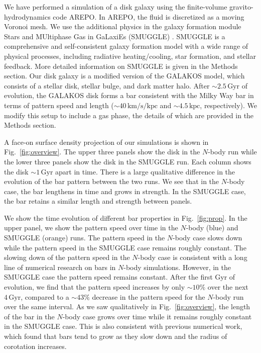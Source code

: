 \documentclass[twoside]{natureprintstyle}
\newcommand{\Nbody}{$N$-body}
\newcommand{\AREPO}{\textsc{AREPO}}
\begin{document}
We have performed a simulation of a disk galaxy using the finite-volume
gravito-hydrodynamics code \AREPO{}.\cite{2010MNRAS.401..791S} In \AREPO{},
the fluid is discretized as a moving Voronoi mesh. We use the additional
physics in the galaxy formation module Stars and MUltiphase Gas in GaLaxiEs
(SMUGGLE) \cite{2019MNRAS.489.4233M}. SMUGGLE is a comprehensive and
self-consistent galaxy formation model with a wide range of physical
processes, including radiative heating/cooling, star formation, and stellar
feedback. More detailed information on SMUGGLE is given in the Methods
section. Our disk galaxy is a modified version of the GALAKOS
model\cite{2020ApJ...890..117D}, which consists of a stellar disk, stellar
bulge, and dark matter halo. After $\sim2.5\,\textrm{Gyr}$ of evolution, the
GALAKOS disk forms a bar consistent with the Milky Way bar in terms of pattern
speed and length
($\sim40\,\textrm{km}/\textrm{s}/\textrm{kpc}$\cite{2022arXiv220606207G} and
$\sim4.5\,\textrm{kpc}$\cite{2015MNRAS.450.4050W}, respectively). We modify
this setup to include a gas phase, the details of which are provided in the
Methods section.

A face-on surface density projection of our simulations is shown in
Fig.~\ref{fig:overview}. The upper three panels show the disk in the \Nbody{}
run while the lower three panels show the disk in the SMUGGLE run. Each column
shows the disk $\sim1\,\textrm{Gyr}$ apart in time. There is a large
qualitative difference in the evolution of the bar pattern between the two
runs. We see that in the \Nbody{} case, the bar lengthens in time and grows in
strength. In the SMUGGLE case, the bar retains a similar length and strength
between panels.

We show the time evolution of different bar properties in Fig.~\ref{fig:prop}.
In the upper panel, we show the pattern speed over time in the \Nbody{} (blue)
and SMUGGLE (orange) runs. The pattern speed in the \Nbody{} case slows down
while the pattern speed in the SMUGGLE case remains roughly constant. The
slowing down of the pattern speed in the \Nbody{} case is consistent with a long
line of numerical research on bars in \Nbody{}
simulations.\cite{1992ApJ...400...80H, 2000ApJ...543..704D,
2002MNRAS.330...35A, 2002ApJ...569L..83A, 2003MNRAS.341.1179A,
2003MNRAS.346..251O, 2005MNRAS.363..991H, 2006ApJ...637..214M,
2007MNRAS.375..460W, 2009ApJ...697..293D} However, in the SMUGGLE case the
pattern speed remains constant. After the first Gyr of evolution, we find that
the pattern speed increases by only $\sim10\%$ over the next
$4\,\textrm{Gyr}$, compared to a $\sim43\%$ decrease in the pattern speed for
the \Nbody{} run over the same interval. As we saw qualitatively in
Fig.~\ref{fig:overview}, the length of the bar in the \Nbody{} case grows over
time while it remains roughly constant in the SMUGGLE case. This is also
consistent with previous numerical work, which found that bars tend to grow as
they slow down and the radius of corotation
increases.\cite{2000ApJ...543..704D, 2003MNRAS.341.1179A}
\end{document}
